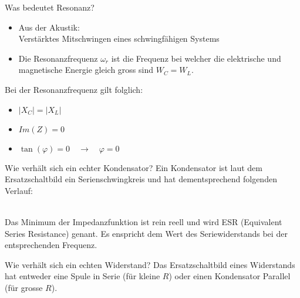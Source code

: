 \begin{karte}{Was bedeutet Resonanz?}
	\begin{itemize}
		\item Aus der Akustik:\\
		Verstärktes Mitschwingen eines schwingfähigen Systems
		\item Die Resonanzfrequenz $\omega_r$ ist die Frequenz bei welcher die elektrische und magnetische Energie gleich gross sind $W_C = W_L$.
	\end{itemize}
	Bei der Resonanzfrequenz gilt folglich:
	\begin{itemize}
		\item $|X_C| = |X_L|$
		\item $Im(Z) = 0$
		\item $\tan (\varphi) = 0 \quad \rightarrow \quad \varphi = 0$
	\end{itemize}
\end{karte}

\begin{karte}{Wie verhält sich ein echter Kondensator?}
	Ein Kondensator ist laut dem Ersatzschaltbild ein Serienschwingkreis und hat dementsprechend folgenden Verlauf:
	
	\begin{minipage}{0.48\textwidth}
		\scalebox{.7}{}
	\end{minipage}
	\begin{minipage}{0.48\textwidth}
		
	\end{minipage}\\[5pt]
	Das Minimum der Impedanzfunktion ist rein reell und wird ESR (Equivalent Series Resistance) genant. Es enspricht dem Wert des Seriewiderstands bei der entsprechenden Frequenz.
\end{karte}

\begin{karte}{Wie verhält sich ein echten Widerstand?}
	Das Ersatzschaltbild eines Widerstands hat entweder eine Spule in Serie (für  kleine $R$) oder einen Kondensator Parallel (für grosse $R$).
	
	\begin{minipage}{0.48\textwidth}
		\scalebox{.85}{}
	\end{minipage}
	\begin{minipage}{0.48\textwidth}
		
	\end{minipage}\\[5pt]
\end{karte}

